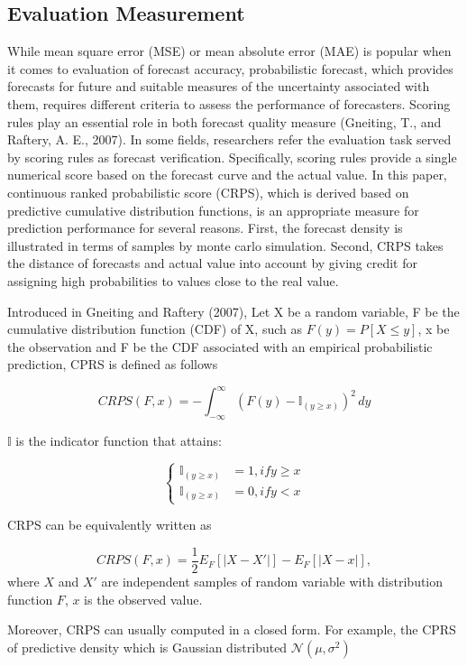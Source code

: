 \documentclass[12pt,a4paper]{article}
\numberwithin{equation}{section}
\begin{document}
\subsection{Evaluation Measurement}
While mean square error (MSE) or mean absolute error (MAE) is popular when it comes to evaluation of forecast accuracy, probabilistic forecast, which provides forecasts for future and suitable measures of the uncertainty associated with them, requires different criteria to assess the performance of forecasters. Scoring rules play an essential role in both forecast quality measure (Gneiting, T., and  Raftery, A. E., 2007). In some fields, researchers refer the evaluation task served by scoring rules as forecast verification. Specifically, scoring rules provide a single numerical score based on the forecast curve and the actual value. In this paper, continuous ranked probabilistic score (CRPS), which is derived based on predictive cumulative distribution functions, is an appropriate measure for prediction performance for several reasons. First, the forecast density is illustrated in terms of samples by monte carlo simulation. Second, CRPS takes the distance of forecasts and actual value into account by giving credit for assigning high probabilities to values close to the real value. 

Introduced in Gneiting and  Raftery (2007), Let X be a random variable, F be the cumulative distribution function (CDF) of X, such as $F(y) = P [X \leq y]$, x be the observation and F be the CDF associated with an empirical probabilistic prediction, CPRS is defined as follows

\[CRPS(F,x) = - \int_{-\infty}^{\infty}  (F(y) - \mathbb{I}_{(y \geq x)}) ^2 \,dy\]

$\mathbb{I}$ is the indicator function that attains:

\begin{equation*}
\begin{cases}
\mathbb{I}_{(y \geq x)} &= 1, if y \geq x\\
\mathbb{I}_{(y \geq x)} &= 0, if y < x
\end{cases}
\end{equation*}

CRPS can be equivalently written as 

\[CRPS(F, x) =  \frac{1}{2} E_F [|X-X'|] - E_F [|X-x|],\]
 where $X$ and $X'$ are independent samples of random variable with distribution function $F$, $x$ is the observed value.
 
 Moreover, CRPS can usually computed in a closed form. For example, the CPRS of predictive density which is Gaussian distributed $\mathcal{N}(\mu, \sigma^2)$
 
\end{document}
